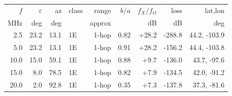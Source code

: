 \begin{tabular}{rrrlrrrrr}
\toprule
$f$ & $\varepsilon$ & az & class & range & $b/a$ & $f_X/f_O$ & loss & lat,lon \\
MHz & deg & deg & & approx & & dB & dB & deg \\
\midrule
2.5 & 23.2 & 13.1 & 1E & 1-hop & 0.82 & +28.2 & -288.8 & 44.2, -103.9 \\
5.0 & 23.2 & 13.1 & 1E & 1-hop & 0.91 & +28.2 & -156.2 & 44.4, -103.8 \\
10.0 & 15.0 & 59.1 & 1E & 1-hop & 0.88 & +9.7 & -136.0 & 43.7, -97.6 \\
15.0 & 8.0 & 78.5 & 1E & 1-hop & 0.82 & +7.9 & -134.5 & 42.0, -91.2 \\
20.0 & 2.0 & 92.8 & 1E & 1-hop & 0.35 & +7.3 & -137.8 & 37.3, -81.6 \\
\bottomrule
\end{tabular}
